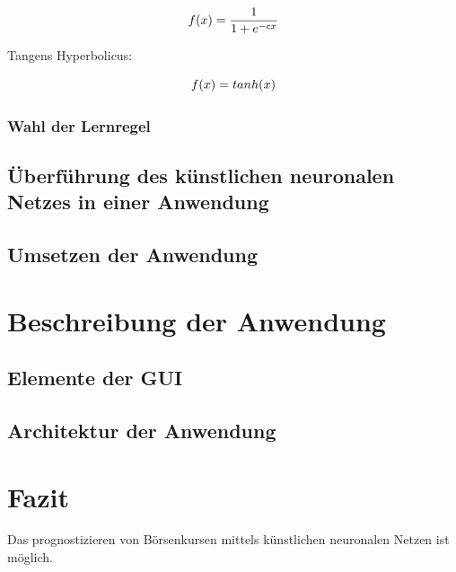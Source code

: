\documentclass[a4paper,DIV11,bibliography=totoc,headings=normal,ngerman,headsepline,listof=totoc]{scrreprt}
\newcommand*{\formelentry}[1]{\addcontentsline{for}{formel}{\protect\numberline{Formel~\theequation} #1}}
\begin{document}
\begin{equation}\formelentry{Sigmoide Funktion}
f(x)= \frac{1}{1+e^{-cx}}
\end{equation}

Tangens Hyperbolicus:

\begin{equation}\formelentry{Tanh Funktion}
f(x)= tanh(x)
\end{equation}

\subsection{Wahl der Lernregel} %
\section{Überführung des künstlichen neuronalen Netzes in einer Anwendung}
\section{Umsetzen der Anwendung} %

\chapter{Beschreibung der Anwendung} %
\section{Elemente der GUI} %
\section{Architektur der Anwendung} %

\chapter{Fazit} %
\label{cha:Fazit}
Das prognostizieren von Börsenkursen mittels künstlichen neuronalen Netzen ist möglich.


\end{document}
